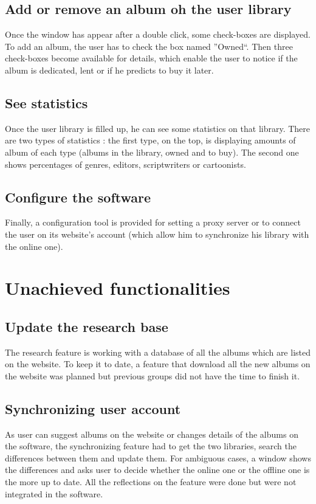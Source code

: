 \documentclass[11pt]{report} %
\begin{document}
\subsection{Add or remove an album oh the user library}
Once the window has appear after a double click, some check-boxes are displayed. To add an album, the user has to check the box named ''Owned``. Then three check-boxes become available for details, which enable the user to notice if the album is dedicated, lent or if he predicts to buy it later.

\subsection{See statistics}
Once the user library is filled up, he can see some statistics on that library. There are two types of statistics : the first type, on the top, is displaying amounts of album of each type (albums in the library, owned and to buy). The second one shows percentages of genres, editors, scriptwriters or cartoonists.

\subsection{Configure the software}
Finally, a configuration tool is provided for setting a proxy server or to connect the user on its website's account (which allow him to synchronize his library with the online one).

\section{Unachieved functionalities}
\subsection{Update the research base}
The research feature is working with a database of all the albums which are listed on the website. To keep it to date, a feature that download all the new albums on the website was planned but previous groups did not have the time to finish it.

\subsection{Synchronizing user account}
As user can suggest albums on the website or changes details of the albums on the software, the synchronizing feature had to get the two libraries, search the differences between them and update them. For ambiguous cases, a window shows the differences and asks user to decide whether the online one or the offline one is the more up to date. All the reflections on the feature were done but were not integrated in the software.
\end{document}
